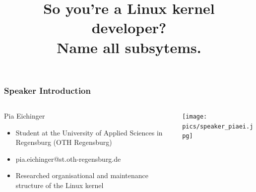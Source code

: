 \documentclass{beamer}
\title{So you're a Linux kernel developer? \\Name all subsytems.}
\begin{document}




	\begin{frame}
	\frametitle{Speaker Introduction}
	\begin{columns}
		\begin{column}{0.65\textwidth}
			\begin{block}{Pia Eichinger}
			\begin{itemize}
			\item Student at the University of Applied Sciences in Regensburg (OTH Regensburg)
			\item pia.eichinger@st.oth-regensburg.de
			\item Researched organisational and maintenance structure of the Linux kernel
			\end{itemize}
			\end{block}
		\end{column}
		\begin{column}{0.3\textwidth}
     		\texttt{[image: pics/speaker\_piaei.jpg]}
		\end{column}
	\end{columns}
	\end{frame}
\end{document}
